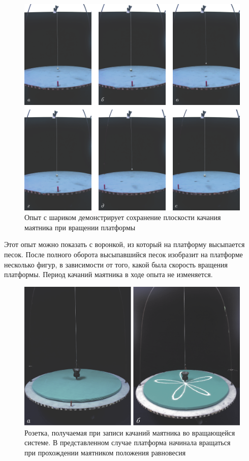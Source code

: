 \documentclass[All.tex]{subfiles}
\begin{document}
	\begin{figure}[H] 	
		\centering 	
		\includegraphics[width=0.9\linewidth]{fuko-2.png}
		\caption{Опыт с шариком демонстрирует сохранение плоскости качания маятника при вращении платформы}
		\label{fuko-2}
	\end{figure}	
		
	Этот опыт можно показать с воронкой, из который на платформу высыпается песок.
	После полного оборота высыпавшийся песок изобразит на платформе несколько фигур, в зависимости от того, какой была скорость вращения платформы.
	Период качаний маятника в ходе опыта не изменяется.
	
\begin{figure}[H] 	
	\centering 	
	\includegraphics[width=0.75\linewidth]{fuko-3.png}
	\caption{Розетка, получаемая при записи качаний маятника во вращающейся системе. В представленном случае платформа начинала вращаться при прохождении маятником положения равновесия}
	\label{fuko-3}
\end{figure}
\end{document}
